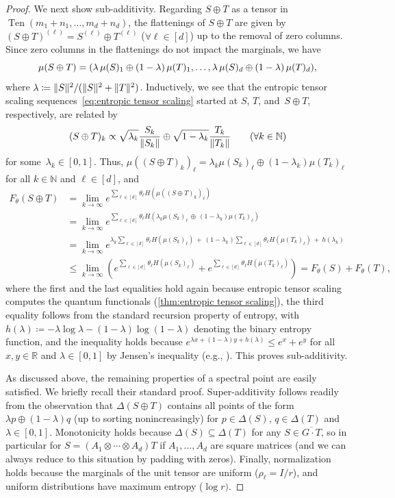 \documentclass[11pt,letterpaper]{article}
\numberwithin{equation}{section}
\newcommand{\ot}{\otimes}
\newcommand{\op}{\oplus}
\newcommand{\RR}{\mathbb{R}}
\newcommand{\NN}{\mathbb{N}}
\newcommand{\qfunc}{F}
\DeclareMathOperator{\Ten}{Ten}
\DeclarePairedDelimiter\norm{\lVert}{\rVert}
\begin{document}
\begin{proof}
We next show sub-additivity.
Regarding $S \op T$ as a tensor in $\Ten(m_1+n_1,\dots,m_d+n_d)$, the flattenings of $S\op T$ are given by $(S\op T)^{(\ell)} = S^{(\ell)}\op T^{(\ell)}$ ($\forall \ell\in [d]$) up to the removal of zero columns.
Since zero columns in the flattenings do not impact the marginals, we have
\[
    \mu(S\op T) = \mleft( \lambda \,\mu(S)_1\op (1-\lambda) \, \mu(T)_1, \dots, \lambda \, \mu(S)_d \op (1-\lambda) \,\mu(T)_d \mright),
\]
where $\lambda \coloneqq\norm{S}^2/(\norm{S}^2+\norm{T}^2)$.
Inductively, we see that the entropic tensor scaling sequences~\eqref{eq:entropic tensor scaling} started at $S$, $T$, and~$S \op T$, respectively, are related by
\[
    (S\op T)_{k} \propto \sqrt{\lambda_k} \frac{S_k}{\norm{S_k}} \op \sqrt{1-\lambda_k} \frac{T_k}{\norm{T_k}} \qquad (\forall k \in \NN)
\]
for some~$\lambda_k\in [0,1]$.
Thus, $\mu((S \op T)_k)_\ell = \lambda_k \mu(S_k)_\ell \op (1-\lambda_k) \mu(T_k)_\ell$ for all $k\in\NN$ and $\ell\in[d]$, and
\begin{align*}
  \qfunc_\theta(S\op T)
&= \lim_{k\to\infty} e^{\sum_{\ell \in [d]}\theta_\ell H(\mu( (S\op T)_k )_\ell)} \\
&= \lim_{k\to\infty} e^{\sum_{\ell \in [d]}\theta_\ell H(\lambda_k \mu(S_k)_\ell \,\op\, (1-\lambda_k) \mu(T_k)_\ell )} \\
&= \lim_{k\to\infty} e^{\lambda_k \sum_{\ell \in [d]}\theta_\ell H(\mu(S_k)_\ell )
\,+\, (1-\lambda_k) \sum_{\ell \in [d]}\theta_\ell H(\mu(T_k)_\ell )
\,+\, h(\lambda_k) } \\
&\leq \lim_{k\to\infty} \left( e^{\sum_{\ell \in [d]}\theta_\ell H(\mu(S_k)_\ell )} + e^{\sum_{\ell \in [d]}\theta_\ell H(\mu(T_k)_\ell )} \right)
= \qfunc_\theta(S) + \qfunc_\theta(T),
\end{align*}
where the first and the last equalities hold again because entropic tensor scaling computes the quantum functionals (\cref{thm:entropic tensor scaling}),
the third equality follows from the standard recursion property of entropy, with $h(\lambda) \coloneqq -\lambda \log\lambda-(1-\lambda)\log(1-\lambda)$ denoting the binary entropy function,
and the inequality holds because $e^{\lambda x+(1-\lambda)y+h(\lambda)} \le e^x+e^y$ for all $x, y \in \RR$ and $\lambda \in [0, 1]$ by Jensen's inequality (e.g., \cite[(2.13)]{Strassen1991}).
This proves sub-additivity.

As discussed above, the remaining properties of a spectral point are easily satisfied.
We briefly recall their standard proof.
Super-additivity follows readily from the observation that $\Delta(S \op T)$ contains all points of the form $\lambda p \op (1-\lambda) q$ (up to sorting nonincreasingly) for $p \in \Delta(S)$, $q \in \Delta(T)$ and $\lambda\in[0,1]$.
Monotonicity holds because $\Delta(S) \subseteq \Delta(T)$ for any $S \in \overline{G \cdot T}$, so in particular for $S = (A_1 \ot \cdots \ot A_d) T$ if $A_1,\dots,A_d$ are square matrices (and we can always reduce to this situation by padding with zeros).
Finally, normalization holds because the marginals of the unit tensor are uniform ($\rho_\ell = I/r$), and uniform distributions have maximum entropy ($\log r)$.
\end{proof}
\end{document}
